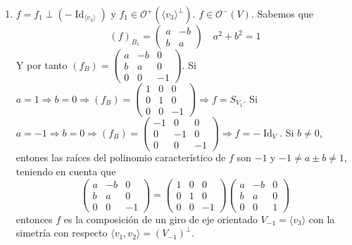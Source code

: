 \documentclass[12pt, a4paper, ones, notitlepage, openany,titlepage]{article}
\begin{document}
\begin{enumerate}[label=(\arabic*)]
	\item $f = f_1 \perp (-\operatorname{Id}_{\langle v_3 \rangle})$ y $f_1 \in \mathcal{O}^+(\langle v_3 \rangle^\perp)$. $f \in \mathcal{O}^-(V)$. Sabemos que
	$$
	(f)_{B_1} = \begin{pmatrix}
		a & -b \\
		b & a
	\end{pmatrix} \quad a^2 + b^2 = 1
	$$
	Y por tanto $\displaystyle (f_B) = \begin{pmatrix}
		a & -b & 0 \\
		b & a & 0 \\
		0 & 0 & -1
	\end{pmatrix}$.
	Si $\displaystyle a = 1 \Longrightarrow b = 0 \Longrightarrow (f_B) = \begin{pmatrix}
		1 & 0 & 0 \\
		0 & 1 & 0 \\
		0 & 0 & -1
	\end{pmatrix} \Longrightarrow f = S_{V_1}$.
	Si $\displaystyle a = -1 \Longrightarrow b = 0 \Longrightarrow (f_B) = \begin{pmatrix}
		-1 & 0 & 0 \\
		0 & -1 & 0 \\
		0 & 0 & -1
	\end{pmatrix} \Longrightarrow f = -\operatorname{Id}_V$.
	Si $b \neq 0$, entones las raíces del polinomio característico de $f$ son $-1$ y $-1 \neq a \pm b \neq 1$, teniendo en cuenta que
	$$
	\begin{pmatrix}
		a & -b & 0 \\
		b & a & 0 \\
		0 & 0 & -1
	\end{pmatrix} = \begin{pmatrix}
		1 & 0 & 0 \\
		0 & 1 & 0 \\
		0 & 0 & -1
	\end{pmatrix} \begin{pmatrix}
		a & -b & 0 \\
		b & a & 0 \\
		0 & 0 & 1
	\end{pmatrix}
	$$
	entonces $f$ es la composición de un giro de eje orientado $V_{-1} = \langle v_3 \rangle$ con la simetría con respecto $\langle v_1, v_2 \rangle = (V_{-1})^\perp$.
	

\end{enumerate}
\end{document}
